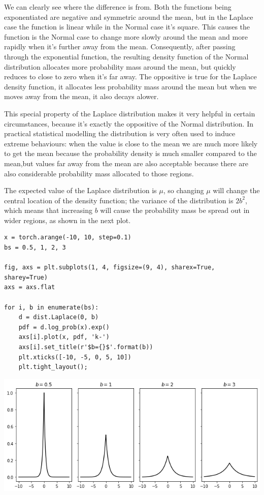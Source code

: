 \documentclass[11pt]{article}
\begin{document}
\begin{enumerate}
We can clearly see where the difference is from. Both the functions being exponentiated are negative and symmetric around the mean, but in the Laplace case the function is linear while in the Normal case it's square. This causes the function is the Normal case to change more slowly around the mean and more rapidly when it's further away from the mean. Consequently, after passing through the exponential function, the resulting density function of the Normal distribution allocates more probability mass around the mean, but quickly reduces to close to zero when it's far away. The oppositive is true for the Laplace density function, it allocates less probability mass around the mean but when we moves away from the mean, it also decays alower.

This special property of the Laplace distribution makes it very helpful in certain circumstances, because it's exactly the oppositive of the Normal distribution. In practical statistical modelling the distribution is very often used to induce extreme behaviours: when the value is close to the mean we are much more likely to get the mean because the probability density is much smaller compared to the mean,but values far away from the mean are also acceptable because there are also considerable probability mass allocated to those regions.

The expected value of the Laplace distribution is \(\mu\), so changing \(\mu\) will change the central location of the density function; the variance of the distribution is \(2b^2\), which means that increasing \(b\) will cause the probability mass be spread out in wider regions, as shown in the next plot.

\begin{verbatim}
x = torch.arange(-10, 10, step=0.1)
bs = 0.5, 1, 2, 3

fig, axs = plt.subplots(1, 4, figsize=(9, 4), sharex=True, sharey=True)
axs = axs.flat

for i, b in enumerate(bs):
    d = dist.Laplace(0, b)
    pdf = d.log_prob(x).exp()
    axs[i].plot(x, pdf, 'k-')
    axs[i].set_title(r'$b={}$'.format(b))
    plt.xticks([-10, -5, 0, 5, 10])
    plt.tight_layout();
\end{verbatim}

\begin{center}
\includegraphics[width=.9\linewidth]{./.ob-jupyter/3747074d3c501a19cc66309cbec55f7aeaf4299c.png}
\end{center}


\end{enumerate}
\end{document}
